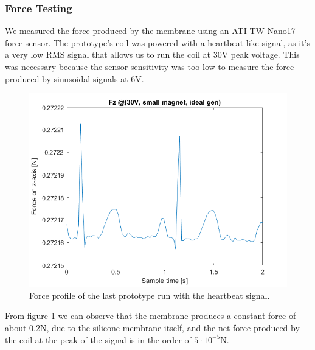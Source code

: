 \subsubsection{Force Testing}
We measured the force produced by the membrane using an ATI TW-Nano17 force sensor. The prototype's coil was powered with a heartbeat-like signal, as it's a very low RMS signal that allows us to run the coil at 30V peak voltage.
This was necessary because the sensor sensitivity was too low to measure the force produced by sinusoidal signals at 6V.
\begin{figure}[H]
    \centering
    \includegraphics[width = 0.5\linewidth]{Figures/Fz_@30V_small_magn_idealgen.png}
    \caption{Force profile of the last prototype run with the heartbeat signal.}
    \label{fig: Force_profile}
\end{figure}
From figure \ref{fig: Force_profile} we can observe that the membrane produces a constant force of about 0.2N, due to the silicone membrane itself, and the net force produced by the coil at the peak of the signal is in the order of $5\cdot10^{-5}$N.